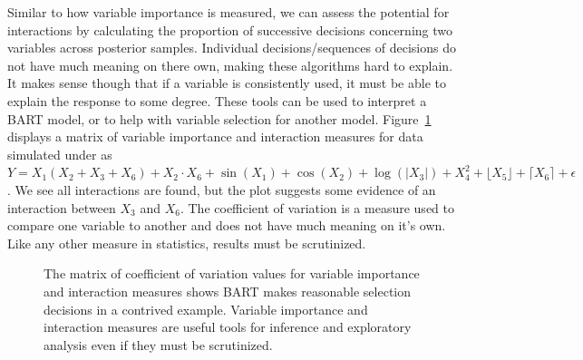 \documentclass[
  12pt,
  letterpaper,
  DIV=11,
  numbers=noendperiod]{scrartcl}
\begin{document}
Similar to how variable importance is measured, we can assess the
potential for interactions by calculating the proportion of successive
decisions concerning two variables across posterior samples. Individual
decisions/sequences of decisions do not have much meaning on there own,
making these algorithms hard to explain. It makes sense though that if a
variable is consistently used, it must be able to explain the response
to some degree. These tools can be used to interpret a BART model, or to
help with variable selection for another model.
Figure~\ref{fig-vimp_vint} displays a matrix of variable importance and
interaction measures for data simulated under as
\(Y=X_1(X_2 + X_3+X_6)+X_2\cdot X_6+\sin(X_1)+\cos(X_2)+\log(|X_3|)+X_4^2+\lfloor X_5\rfloor+\lceil X_6\rceil+\epsilon\).
We see all interactions are found, but the plot suggests some evidence
of an interaction between \(X_3\) and \(X_6\). The coefficient of
variation is a measure used to compare one variable to another and does
not have much meaning on it's own. Like any other measure in statistics,
results must be scrutinized.

\begin{figure}[H]


\caption{\label{fig-vimp_vint}The matrix of coefficient of variation
values for variable importance and interaction measures shows BART makes
reasonable selection decisions in a contrived example. Variable
importance and interaction measures are useful tools for inference and
exploratory analysis even if they must be scrutinized.}

\end{figure}%
\end{document}
